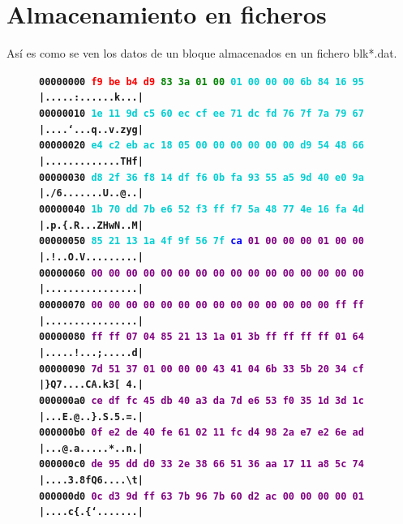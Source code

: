 \documentclass{article}
\begin{document}
\section{Almacenamiento en ficheros}
    Así es como se ven los datos de un bloque almacenados en un fichero blk*.dat.
    
    \begin{figure}[H]
    \scriptsize{
    \textbf{\texttt{00000000  \textcolor{red}{f9 be b4 d9} \textcolor{green}{83 3a 01 00}  \textcolor{darkTurquoise}{01 00 00 00 6b 84 16 95}  |.....:......k...|} \\
    \texttt{00000010  \textcolor{darkTurquoise}{1e 11 9d c5 60 ec cf ee  71 dc fd 76 7f 7a 79 67}  |....`...q..v.zyg|} \\
    \texttt{00000020  \textcolor{darkTurquoise}{e4 c2 eb ac 18 05 00 00  00 00 00 00 d9 54 48 66}  |.............THf|} \\
    \texttt{00000030  \textcolor{darkTurquoise}{d8 2f 36 f8 14 df f6 0b  fa 93 55 a5 9d 40 e0 9a}  |./6.......U..@..|} \\
    \texttt{00000040  \textcolor{darkTurquoise}{1b 70 dd 7b e6 52 f3 ff  f7 5a 48 77 4e 16 fa 4d}  |.p.\{.R...ZHwN..M|} \\
    \texttt{00000050  \textcolor{darkTurquoise}{85 21 13 1a 4f 9f 56 7f}  \textcolor{blue}{ca} \textcolor{purple}{01 00 00 00 01 00 00}  |.!..O.V.........|} \\
    \texttt{00000060  \textcolor{purple}{00 00 00 00 00 00 00 00  00 00 00 00 00 00 00 00}  |................|} \\
    \texttt{00000070  \textcolor{purple}{00 00 00 00 00 00 00 00  00 00 00 00 00 00 ff ff}  |................|} \\
    \texttt{00000080  \textcolor{purple}{ff ff 07 04 85 21 13 1a  01 3b ff ff ff ff 01 64}  |.....!...;.....d|} \\
    \texttt{00000090  \textcolor{purple}{7d 51 37 01 00 00 00 43  41 04 6b 33 5b 20 34 cf}  |\}Q7....CA.k3[ 4.|} \\
    \texttt{000000a0  \textcolor{purple}{ce df fc 45 db 40 a3 da  7d e6 53 f0 35 1d 3d 1c}  |...E.@..\}.S.5.=.|} \\
    \texttt{000000b0  \textcolor{purple}{0f e2 de 40 fe 61 02 11  fc d4 98 2a e7 e2 6e ad}  |...@.a.....*..n.|} \\
    \texttt{000000c0  \textcolor{purple}{de 95 dd d0 33 2e 38 66  51 36 aa 17 11 a8 5c 74}  |....3.8fQ6....\textbackslash t|} \\
    \texttt{000000d0  \textcolor{purple}{0c d3 9d ff 63 7b 96 7b  60 d2 ac 00 00 00 00 01}  |....c\{.\{`.......|} \\
}}
\end{figure}
\end{document}
